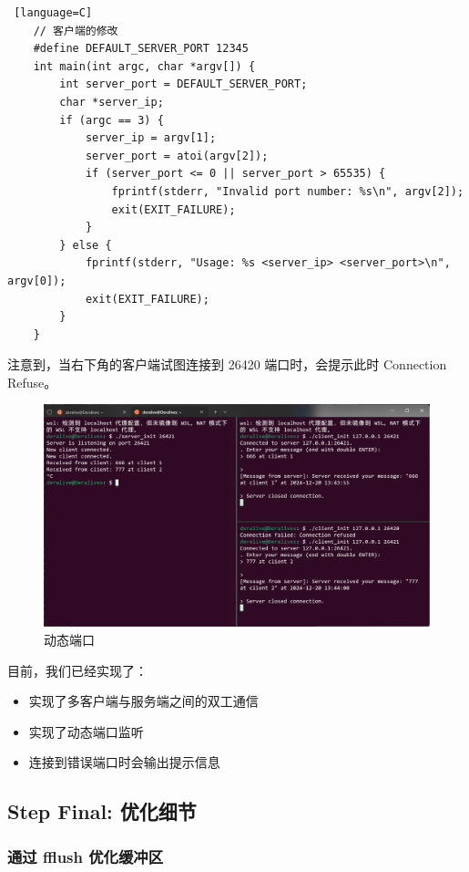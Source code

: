 \documentclass[14pt,a4paper,UTF8,twoside]{article}
\begin{document}
\begin{lstlisting} [language=C]
    // 客户端的修改
    #define DEFAULT_SERVER_PORT 12345
    int main(int argc, char *argv[]) {
        int server_port = DEFAULT_SERVER_PORT;
        char *server_ip;
        if (argc == 3) {
            server_ip = argv[1];
            server_port = atoi(argv[2]);
            if (server_port <= 0 || server_port > 65535) {
                fprintf(stderr, "Invalid port number: %s\n", argv[2]);
                exit(EXIT_FAILURE);
            }
        } else {
            fprintf(stderr, "Usage: %s <server_ip> <server_port>\n", argv[0]);
            exit(EXIT_FAILURE);
        }
    }
\end{lstlisting}

注意到，当右下角的客户端试图连接到 26420 端口时，会提示此时 Connection Refuse。

\begin{figure}[H]
    \centering
    \includegraphics[width=0.7\linewidth]{lab7/dynamicport.png}
    \caption{动态端口}
    \label{fig:dynamicport}
\end{figure}

\begin{rmr}
    目前，我们已经实现了：

    \begin{itemize} 
        \item 实现了多客户端与服务端之间的双工通信
        \item 实现了动态端口监听
        \item 连接到错误端口时会输出提示信息
    \end{itemize}

\end{rmr}

\subsection{Step Final: 优化细节}

\subsubsection{通过 fflush 优化缓冲区}
\end{document}
